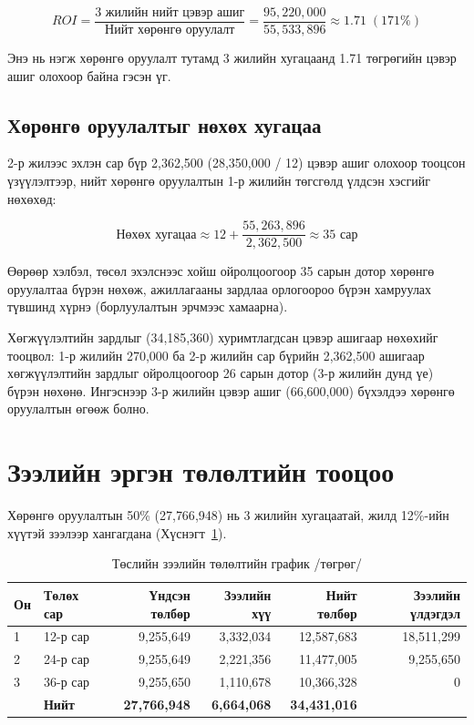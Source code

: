 \begin{equation}
  ROI = \frac{\text{3 жилийн нийт цэвэр ашиг}}{\text{Нийт хөрөнгө оруулалт}}
      = \frac{95{,}220{,}000}{55{,}533{,}896} \approx 1.71 \; (171\%)
\end{equation}

\noindent Энэ нь нэгж хөрөнгө оруулалт тутамд 3 жилийн хугацаанд
1.71 төгрөгийн цэвэр ашиг олохоор байна гэсэн үг.

\subsection{Хөрөнгө оруулалтыг нөхөх хугацаа}

2-р жилээс эхлэн сар бүр 2{,}362{,}500\textcurrency{} (28{,}350{,}000 / 12)
цэвэр ашиг олохоор тооцсон үзүүлэлтээр, нийт хөрөнгө оруулалтын
1-р жилийн төгсгөлд үлдсэн хэсгийг нөхөхөд:

\begin{equation}
  \text{Нөхөх хугацаа} \approx 12 + \frac{55{,}263{,}896}{2{,}362{,}500}
  \approx 35 \text{ сар}
\end{equation}

\noindent Өөрөөр хэлбэл, төсөл эхэлснээс хойш ойролцоогоор 35 сарын
дотор хөрөнгө оруулалтаа бүрэн нөхөж, ажиллагааны зардлаа орлогоороо
бүрэн хамруулах түвшинд хүрнэ (борлуулалтын эрчмээс хамаарна).

\noindent Хөгжүүлэлтийн зардлыг (34{,}185{,}360\textcurrency{})
хуримтлагдсан цэвэр ашигаар нөхөхийг тооцвол: 1-р жилийн 270{,}000\textcurrency{}
ба 2-р жилийн сар бүрийн 2{,}362{,}500\textcurrency{} ашигаар
хөгжүүлэлтийн зардлыг ойролцоогоор 26 сарын дотор (3-р жилийн
дунд үе) бүрэн нөхөнө. Ингэснээр 3-р жилийн цэвэр ашиг
(66{,}600{,}000\textcurrency{}) бүхэлдээ хөрөнгө оруулалтын өгөөж болно.

\section{Зээлийн эргэн төлөлтийн тооцоо}

Хөрөнгө оруулалтын 50\% (27{,}766{,}948\textcurrency{}) нь 3 жилийн
хугацаатай, жилд 12\%-ийн хүүтэй зээлээр хангагдана
(Хүснэгт~\ref{tab:ch6-zeel}).

\begin{table}[h]
  \centering
  \caption{Төслийн зээлийн төлөлтийн график /төгрөг/}
  \label{tab:ch6-zeel}
  \small
  \begin{tabular}{@{}p{1.4cm}p{2.2cm}rrrr@{}}
    \toprule
    \textbf{Он} & \textbf{Төлөх сар} & \textbf{Үндсэн төлбөр} &
    \textbf{Зээлийн хүү} & \textbf{Нийт төлбөр} & \textbf{Зээлийн
    үлдэгдэл} \\ \midrule
    1 & 12-р сар & 9{,}255{,}649 & 3{,}332{,}034 & 12{,}587{,}683 &
    18{,}511{,}299 \\
    2 & 24-р сар & 9{,}255{,}649 & 2{,}221{,}356 & 11{,}477{,}005 &
    9{,}255{,}650 \\
    3 & 36-р сар & 9{,}255{,}650 & 1{,}110{,}678 & 10{,}366{,}328 & 0 \\
    \midrule
    & \textbf{Нийт} & \textbf{27{,}766{,}948} & \textbf{6{,}664{,}068} &
    \textbf{34{,}431{,}016} & \\
    \bottomrule
  \end{tabular}
\end{table}
